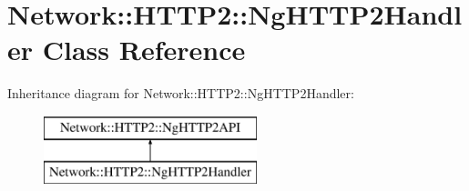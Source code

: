 \hypertarget{classNetwork_1_1HTTP2_1_1NgHTTP2Handler}{}\section{Network\+:\+:H\+T\+T\+P2\+:\+:Ng\+H\+T\+T\+P2\+Handler Class Reference}
\label{classNetwork_1_1HTTP2_1_1NgHTTP2Handler}
Inheritance diagram for Network\+:\+:H\+T\+T\+P2\+:\+:Ng\+H\+T\+T\+P2\+Handler\+:\begin{figure}[H]
\begin{center}
\leavevmode
\includegraphics[height=2.000000cm]{d4/d0d/classNetwork_1_1HTTP2_1_1NgHTTP2Handler}
\end{center}
\end{figure}
